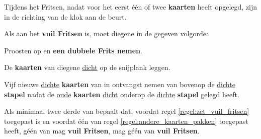 
\vervolgLijst{}
\item Tijdens het Fritsen, nadat \Willem voor het eerst \'e\'en of twee \textbf{kaarten} heeft opgelegd, zijn \alleSpelers in de richting van de klok aan de beurt\footnotemark[5].
\eindLijst{}



\newpage
{}
\label{sec:vuil_fritsen}


\vervolgLijst{}
\item Als \eenSpeler aan het \textbf{vuil Fritsen} is, moet diegene in de gegeven volgorde:
\puntLijst{}
\item Proosten op  en \textbf{een dubbele Frits nemen}\footnotemark[2].
\item De \textbf{kaarten} van diegene \ul{dicht} op de snijplank leggen.
\item Vijf nieuwe \ul{dichte} \textbf{kaarten} van \Frits in ontvangst nemen van bovenop de \ul{dichte} \textbf{stapel} nadat \Frits de \ul{oude} \textbf{kaarten} \ul{dicht} onderop de \ul{dichte} \textbf{stapel} gelegd heeft.
\eindPuntLijst{}
\label{regel:zet_vuil_fritsen}
\eindLijst{}

\vervolgLijst{}
\item Als minimaal twee derde van \alleSpelers bepaalt dat, voordat regel \ref{regel:zet_vuil_fritsen} toegepast is en voordat \'e\'en van \alleSpelers regel \ref{regel:andere_kaarten_pakken} toegepast heeft, géén van \alleSpelers mag \textbf{vuil Fritsen}, mag géén van \alleSpelers \textbf{vuil Fritsen}.
\label{regel:skip_vuil_fritsen}
\eindLijst{}

